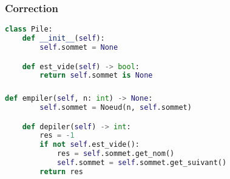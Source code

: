 \documentclass[svgnames,11pt]{beamer}
\begin{document}
\begin{frame}[fragile]
    \frametitle{Correction}

\begin{center}
\begin{lstlisting}[language=Python , basicstyle=\ttfamily\small, xleftmargin=0.2em, xrightmargin=0em]
class Pile:
    def __init__(self):
        self.sommet = None

    def est_vide(self) -> bool:
        return self.sommet is None
\end{lstlisting}
\end{center} 

\end{frame}
\begin{frame}[fragile]
    \frametitle{}

\begin{center}
\begin{lstlisting}[language=Python , basicstyle=\ttfamily\small, xleftmargin=0.2em, xrightmargin=0em]
    def empiler(self, n: int) -> None:
        self.sommet = Noeud(n, self.sommet)

    def depiler(self) -> int:
        res = -1
        if not self.est_vide():
            res = self.sommet.get_nom()
            self.sommet = self.sommet.get_suivant()
        return res
\end{lstlisting}
\end{center} 

\end{frame}
\begin{frame}
    \frametitle{}

    \begin{center}
    

    \end{center}

\end{frame}
\end{document}
